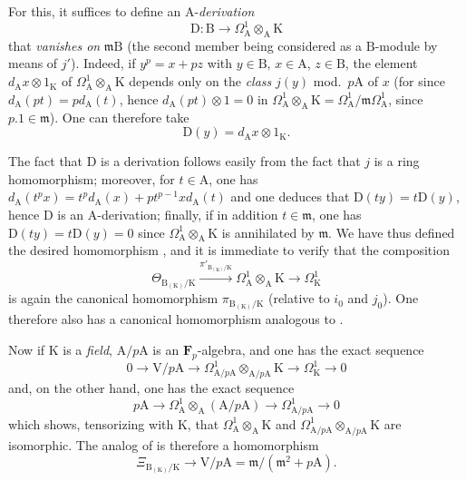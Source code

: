 \begin{remark}[22.4.8]
For this, it suffices to define an $\mathrm{A}$-\emph{derivation}
\[
\label{0.22.4.8.3}
  \mathrm{D}:\mathrm{B}\to\Omega^1_\mathrm{A}\otimes_\mathrm{A}\mathrm{K}
  \tag{22.4.8.3}
\]
that \emph{vanishes on} $\mathfrak{m}\mathrm{B}$ (the second member being considered as a $\mathrm{B}$-module by means of $j'$).
Indeed, if $y^p=x+pz$ with $y\in\mathrm{B}$, $x\in\mathrm{A}$, $z\in\mathrm{B}$, the element $d_\mathrm{A}x\otimes 1_\mathrm{K}$ of $\Omega^1_\mathrm{A}\otimes_\mathrm{A}\mathrm{K}$ depends only on the \emph{class} $j(y)$ mod.~$p\mathrm{A}$ of $x$ (for since $d_\mathrm{A}(pt)=pd_\mathrm{A}(t)$, hence $d_\mathrm{A}(pt)\otimes 1=0$ in $\Omega^1_\mathrm{A}\otimes_\mathrm{A}\mathrm{K}=\Omega^1_\mathrm{A}/\mathfrak{m}\Omega^1_\mathrm{A}$, since $p.1\in\mathfrak{m}$).
One can therefore take
\[
  \mathrm{D}(y)=d_\mathrm{A}x\otimes 1_\mathrm{K}.
\]

The fact that $\mathrm{D}$ is a derivation follows easily from the fact that $j$ is a ring homomorphism; moreover, for $t\in\mathrm{A}$, one has $d_\mathrm{A}(t^px)=t^pd_\mathrm{A}(x)+pt^{p-1}xd_\mathrm{A}(t)$ and one deduces that $\mathrm{D}(ty)=t\mathrm{D}(y)$, hence $\mathrm{D}$ is an $\mathrm{A}$-derivation; finally, if in addition $t\in\mathfrak{m}$, one has
$\mathrm{D}(ty)=t\mathrm{D}(y)=0$ since $\Omega^1_\mathrm{A}\otimes_\mathrm{A}\mathrm{K}$ is annihilated by $\mathfrak{m}$.
We have thus defined the desired homomorphism , and it is immediate to verify that the composition
\[
  \Theta_{\mathrm{B}_{(\mathrm{K})}/\mathrm{K}}\xrightarrow{\pi'_{\mathrm{B}_{(\mathrm{K})}/\mathrm{K}}}\Omega^1_\mathrm{A}\otimes_\mathrm{A}\mathrm{K}\to\Omega^1_\mathrm{K}
\]
is again the canonical homomorphism $\pi_{\mathrm{B}_{(\mathrm{K})}/\mathrm{K}}$ (relative to $i_0$ and $j_0$).
One therefore also has a canonical homomorphism analogous to .

Now if $\mathrm{K}$ is a \emph{field}, $\mathrm{A}/p\mathrm{A}$ is an $\mathbf{F}_p$-algebra, and one has the exact sequence 
\[
  0\to\mathrm{V}/p\mathrm{A}\to\Omega^1_{\mathrm{A}/p\mathrm{A}}\otimes_{\mathrm{A}/p\mathrm{A}}\mathrm{K}\to\Omega^1_\mathrm{K}\to 0
\]
and, on the other hand, one has the exact sequence 
\[
  p\mathrm{A}\to\Omega^1_\mathrm{A}\otimes_\mathrm{A}(\mathrm{A}/p\mathrm{A})\to\Omega^1_{\mathrm{A}/p\mathrm{A}}\to 0
\]
which shows, tensorizing with $\mathrm{K}$, that $\Omega^1_\mathrm{A}\otimes_\mathrm{A}\mathrm{K}$ and $\Omega^1_{\mathrm{A}/p\mathrm{A}}\otimes_{\mathrm{A}/p\mathrm{A}}\mathrm{K}$ are isomorphic.
The analog of  is therefore a homomorphism
\[
\label{0.22.4.8.4}
  \Xi_{\mathrm{B}_{(\mathrm{K})}/\mathrm{K}}\to\mathrm{V}/p\mathrm{A}=\mathfrak{m}/(\mathfrak{m}^2+p\mathrm{A}).
  \tag{22.4.8.4}
\]


\end{remark}
